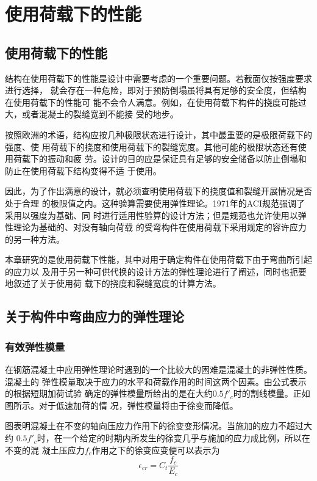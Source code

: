 \documentclass[12pt,a4paper]{book}
\begin{document}
\chapter{使用荷载下的性能}

\section{使用荷载下的性能}

结构在使用荷载下的性能是设计中需要考虑的一个重要问题。若截面仅按强度要求进行选择，
就会存在一种危险，即对于预防倒塌虽将具有足够的安全度，但结构在使用荷载下的性能可
能不会令人满意。例如，在使用荷载下构件的挠度可能过大，或者混凝土的裂缝宽到不能接
受的地步。

按照欧洲的术语，结构应按几种极限状态进行设计，其中最重要的是极限荷载下的强度、使
用荷载下的挠度和使用荷载下的裂缝宽度。其他可能的极限状态还有使用荷载下的振动和疲
劳。设计的目的应是保证具有足够的安全储备以防止倒塌和防止在使用荷载下结构变得不适
于使用。

因此，为了作出满意的设计，就必须查明使用荷载下的挠度值和裂缝开展情况是否处于合理
的极限值之内。这种验算需要使用弹性理论。1971年的ACI规范强调了采用以强度为基础、同
时进行适用性验算的设计方法；但是规范也允许使用以弹性理论为基础的、对没有轴向荷载
的受弯构件在使用荷载下采用规定的容许应力的另一种方法。

本章研究的是使用荷载下性能，其中对用于确定构件在使用荷载下由于弯曲所引起的应力以
及用于另一种可供代换的设计方法的弹性理论进行了阐述，同时也扼要地叙述了关于使用荷
载下的挠度和裂缝宽度的计算方法。

\section{关于构件中弯曲应力的弹性理论}

\subsection{有效弹性模量}

在钢筋混凝土中应用弹性理论时遇到的一个比较大的困难是混凝土的非弹性性质。混凝土的
弹性模量取决于应力的水平和荷载作用的时间这两个因素。由公式表示的根据短期加荷试验
确定的弹性模量所给出的是在大约$0.5f'_c$时的割线模量。正如图所示。对于低速加荷的情
况，弹性模量将由于徐变而降低。

图表明混凝土在不变的轴向压应力作用下的徐变变形情况。当施加的应力不超过大约
$0.5f'_c$时，在一个给定的时期内所发生的徐变几乎与施加的应力成比例，所以在不变的混
凝土压应力$f_c$作用之下的徐变应变便可以表示为
\begin{equation}
  \label{eq:16} \epsilon_{cr}=C_t\frac{f_c}{E_c}
\end{equation}
\end{document}
